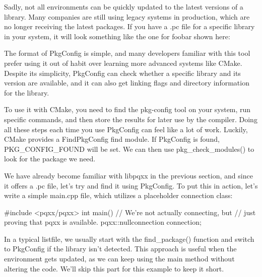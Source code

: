 Sadly, not all environments can be quickly updated to the latest versions of a library. Many companies are still using legacy systems in production, which are no longer receiving the latest packages. If you have a .pc file for a specific library in your system, it will look something like the one for foobar shown here:


The format of PkgConfig is simple, and many developers familiar with this tool prefer using it out of habit over learning more advanced systems like CMake. Despite its simplicity, PkgConfig can check whether a specific library and its version are available, and it can also get linking flags and directory information for the library.

To use it with CMake, you need to find the pkg-config tool on your system, run specific commands, and then store the results for later use by the compiler. Doing all these steps each time you use PkgConfig can feel like a lot of work. Luckily, CMake provides a FindPkgConfig find module. If PkgConfig is found, PKG\_CONFIG\_FOUND will be set. We can then use pkg\_check\_modules() to look for the package we need.

We have already become familiar with libpqxx in the previous section, and since it offers a .pc file, let’s try and find it using PkgConfig. To put this in action, let’s write a simple main.cpp file, which utilizes a placeholder connection class:


\begin{cpp}
#include <pqxx/pqxx>
int main()
{
    // We're not actually connecting, but
    // just proving that pqxx is available.
    pqxx::nullconnection connection;
}
\end{cpp}

In a typical listfile, we usually start with the find\_package() function and switch to PkgConfig if the library isn’t detected. This approach is useful when the environment gets updated, as we can keep using the main method without altering the code. We’ll skip this part for this example to keep it short.


